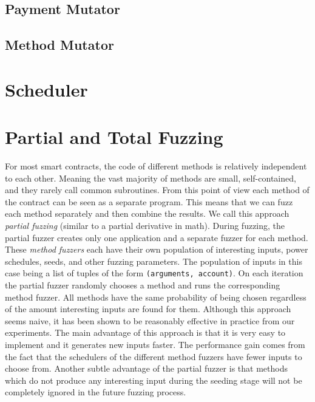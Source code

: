 \subsection*{Payment Mutator}

\subsection*{Method Mutator}


\section{Scheduler}

\section{Partial and Total Fuzzing}
For most smart contracts, the code of different methods is relatively independent to each other.
Meaning the vast majority of methods are small, self-contained, and they rarely call common subroutines.
From this point of view each method of the contract can be seen as a separate program.
This means that we can fuzz each method separately and then combine the results.
We call this approach \textit{partial fuzzing} (similar to a partial derivative in math).
During fuzzing, the partial fuzzer creates only one application and a separate fuzzer for each method.
These \textit{method fuzzers} each have their own population of interesting inputs, power schedules, seeds, and other fuzzing parameters.
The population of inputs in this case being a list of tuples of the form \texttt{(arguments, account)}.
On each iteration the partial fuzzer randomly chooses a method and runs the corresponding method fuzzer.
All methods have the same probability of being chosen regardless of the amount interesting inputs are found for them.
Although this approach seems naive, it has been shown to be reasonably effective in practice from our experiments.
The main advantage of this approach is that it is very easy to implement and it generates new inputs faster.
The performance gain comes from the fact that the schedulers of the different method fuzzers have fewer inputs to choose from.
Another subtle advantage of the partial fuzzer is that methods which do not produce any interesting input during the seeding stage will not be completely ignored in the future fuzzing process.

